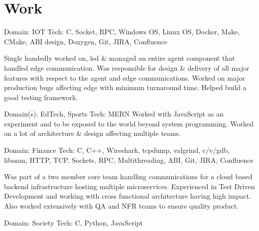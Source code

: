 \documentclass{resume_v02}
\begin{document}
\medskip

\bigskip

\section{Work}


\workitems
{Domain: IOT}
{Tech: C, Socket, RPC, Windows OS, Linux OS, Docker, Make, CMake, ABI design, Doxygen, Git, JIRA, Confluence}

Single handedly worked on, led \& managed an entire agent component that handled edge communication. Was responsible for design \& delivery of all major features with respect to the agent and edge communications. Worked on major production bugs affecting edge with minimum turnaround time. Helped build a good testing framework.

\workitems
{Domain(s): EdTech, Sports}
{Tech: MERN}
Worked with JavaScript as an experiment and to be exposed to the world beyond system programming. Worked on a lot of architecture \& design affecting multiple teams. 

\workitems
{Domain: Finance}
{Tech: C, C++, Wireshark, tcpdump, valgrind, c/v/gdb, libasan, HTTP, TCP, Sockets, RPC, Multithreading, ABI, Git, JIRA, Confluence}

Was part of a two member core team handling communications for a cloud based backend infrastructure hosting multiple microservices. Experienced in Test Driven Development and working with cross functional architecture having high impact. Also worked extensively with QA and NFR teams to ensure quality product.

\workitems
{Domain: Society}
{Tech: C, Python, JavaScript}
\end{document}
